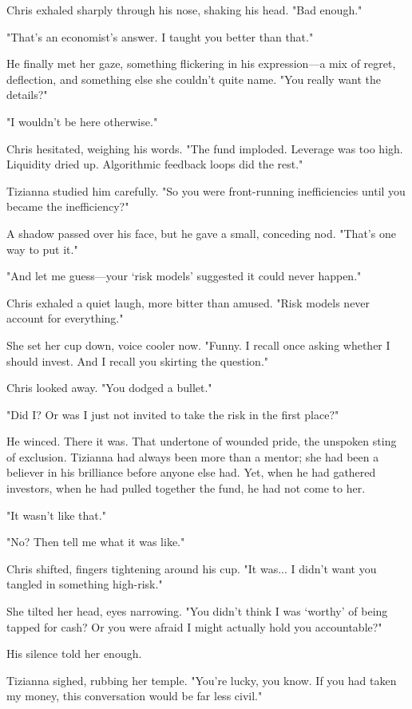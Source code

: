 Chris exhaled sharply through his nose, shaking his head. "Bad enough."

"That’s an economist’s answer. I taught you better than that."

He finally met her gaze, something flickering in his expression—a mix of regret, deflection, and something else she couldn’t quite name. "You really want the details?"

"I wouldn’t be here otherwise."

Chris hesitated, weighing his words. "The fund imploded. Leverage was too high. Liquidity dried up. Algorithmic feedback loops did the rest."

Tizianna studied him carefully. "So you were front-running inefficiencies until you became the inefficiency?"

A shadow passed over his face, but he gave a small, conceding nod. "That’s one way to put it."

"And let me guess—your ‘risk models’ suggested it could never happen."

Chris exhaled a quiet laugh, more bitter than amused. "Risk models never account for everything."

She set her cup down, voice cooler now. "Funny. I recall once asking whether I should invest. And I recall you skirting the question."

Chris looked away. "You dodged a bullet."

"Did I? Or was I just not invited to take the risk in the first place?"

He winced. There it was. That undertone of wounded pride, the unspoken sting of exclusion. Tizianna had always been more than a mentor; she had been a believer in his brilliance before anyone else had. Yet, when he had gathered investors, when he had pulled together the fund, he had not come to her.

"It wasn’t like that."

"No? Then tell me what it was like."

Chris shifted, fingers tightening around his cup. "It was... I didn’t want you tangled in something high-risk."

She tilted her head, eyes narrowing. "You didn’t think I was ‘worthy’ of being tapped for cash? Or you were afraid I might actually hold you accountable?"

His silence told her enough.

Tizianna sighed, rubbing her temple. "You’re lucky, you know. If you had taken my money, this conversation would be far less civil."

